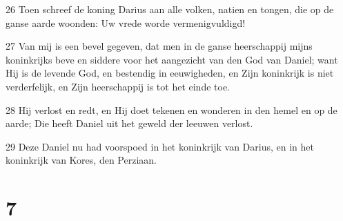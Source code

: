 \par 26 Toen schreef de koning Darius aan alle volken, natien en tongen, die op de ganse aarde woonden: Uw vrede worde vermenigvuldigd!
\par 27 Van mij is een bevel gegeven, dat men in de ganse heerschappij mijns koninkrijks beve en siddere voor het aangezicht van den God van Daniel; want Hij is de levende God, en bestendig in eeuwigheden, en Zijn koninkrijk is niet verderfelijk, en Zijn heerschappij is tot het einde toe.
\par 28 Hij verlost en redt, en Hij doet tekenen en wonderen in den hemel en op de aarde; Die heeft Daniel uit het geweld der leeuwen verlost.
\par 29 Deze Daniel nu had voorspoed in het koninkrijk van Darius, en in het koninkrijk van Kores, den Perziaan.

\chapter{7}

